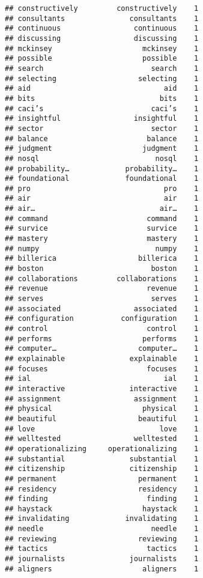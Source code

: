 \documentclass[]{article}
\begin{document}
\begin{verbatim}
## constructively         constructively    1
## consultants               consultants    1
## continuous                 continuous    1
## discussing                 discussing    1
## mckinsey                     mckinsey    1
## possible                     possible    1
## search                         search    1
## selecting                   selecting    1
## aid                               aid    1
## bits                             bits    1
## caci’s                         caci’s    1
## insightful                 insightful    1
## sector                         sector    1
## balance                       balance    1
## judgment                     judgment    1
## nosql                           nosql    1
## probability…             probability…    1
## foundational             foundational    1
## pro                               pro    1
## air                               air    1
## air…                             air…    1
## command                       command    1
## survice                       survice    1
## mastery                       mastery    1
## numpy                           numpy    1
## billerica                   billerica    1
## boston                         boston    1
## collaborations         collaborations    1
## revenue                       revenue    1
## serves                         serves    1
## associated                 associated    1
## configuration           configuration    1
## control                       control    1
## performs                     performs    1
## computer…                   computer…    1
## explainable               explainable    1
## focuses                       focuses    1
## ial                               ial    1
## interactive               interactive    1
## assignment                 assignment    1
## physical                     physical    1
## beautiful                   beautiful    1
## love                             love    1
## welltested                 welltested    1
## operationalizing     operationalizing    1
## substantial               substantial    1
## citizenship               citizenship    1
## permanent                   permanent    1
## residency                   residency    1
## finding                       finding    1
## haystack                     haystack    1
## invalidating             invalidating    1
## needle                         needle    1
## reviewing                   reviewing    1
## tactics                       tactics    1
## journalists               journalists    1
## aligners                     aligners    1

\end{verbatim}
\end{document}
